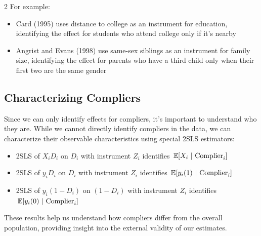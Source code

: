 \documentclass[12pt]{article}
\begin{document}
\begin{multicols}{2}
For example:
\begin{itemize}
  \item Card (1995) uses distance to college as an instrument for education, identifying the effect for students who attend college only if it's nearby
  \item Angrist and Evans (1998) use same-sex siblings as an instrument for family size, identifying the effect for parents who have a third child only when their first two are the same gender
\end{itemize}

\subsection*{Characterizing Compliers}

Since we can only identify effects for compliers, it's important to understand who they are.
While we cannot directly identify compliers in the data, we can characterize their observable characteristics using special 2SLS estimators:

\begin{itemize}
  \item 2SLS of $X_i D_i$ on $D_i$ with instrument $Z_i$ identifies $\expec{X_i}{\text{Complier}_i}$
  \item 2SLS of $y_i D_i$ on $D_i$ with instrument $Z_i$ identifies $\expec{y_i(1)}{\text{Complier}_i}$
  \item 2SLS of $y_i (1-D_i)$ on $(1-D_i)$ with instrument $Z_i$ identifies $\expec{y_i(0)}{\text{Complier}_i}$
\end{itemize}

These results help us understand how compliers differ from the overall population, providing insight into the external validity of our estimates.


% 
% 
% 
% 



\end{multicols}
\end{document}
